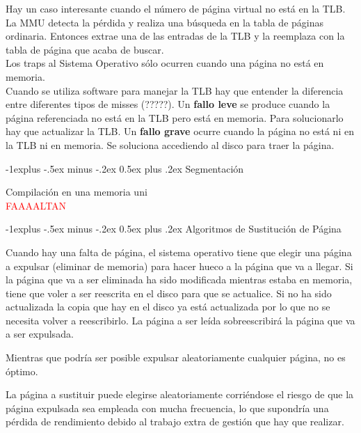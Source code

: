 \documentclass[10pt,portrait, twocolumn]{article}
\makeatletter
\renewcommand{\subsection}{\@startsection{subsection}{2}{0mm}%
                                {-1explus -.5ex minus -.2ex}%
                                {0.5ex plus .2ex}%
                                {\normalfont\normalsize\bfseries}}
\makeatother
\begin{document}
	\quad Hay un caso interesante cuando el número de página virtual no está en la TLB. La MMU detecta la pérdida y realiza una búsqueda en la tabla de páginas ordinaria. Entonces extrae una de las entradas de la TLB y la reemplaza con la tabla de página que acaba de buscar. \\
	
Los traps al Sistema Operativo sólo ocurren cuando una página no está en memoria.\\ 

Cuando se utiliza software para manejar la TLB hay que entender la diferencia entre diferentes tipos de misses (?????). Un \textbf{fallo leve} se produce cuando la página referenciada no está en la TLB pero está en memoria. Para solucionarlo hay que actualizar la TLB. Un \textbf{fallo grave} ocurre cuando la página no está ni en la TLB ni en memoria. Se soluciona accediendo al disco para traer la página.
	


\subsection{Segmentación}

Compilación en una memoria uni\\

\textcolor{red}{FAAAALTAN}

\subsection{Algoritmos de Sustitución de Página}

Cuando hay una falta de página, el sistema operativo tiene que elegir una página a expulsar (eliminar de memoria) para hacer hueco a la página que va a llegar. Si la página que va a ser eliminada ha sido modificada mientras estaba en memoria, tiene que voler a ser reescrita en el disco para que se actualice. Si no ha sido actualizada la copia que hay en el disco ya está actualizada por lo que no se necesita volver a reescribirlo. La página a ser leída sobreescribirá la página que va a ser expulsada.

	\quad Mientras que podría ser posible expulsar aleatoriamente cualquier página, no es óptimo.
	
La página a sustituir puede elegirse aleatoriamente corriéndose el riesgo de que la página expulsada sea empleada con mucha frecuencia, lo que supondría una pérdida de rendimiento debido al trabajo extra de gestión que hay que realizar.
\end{document}
